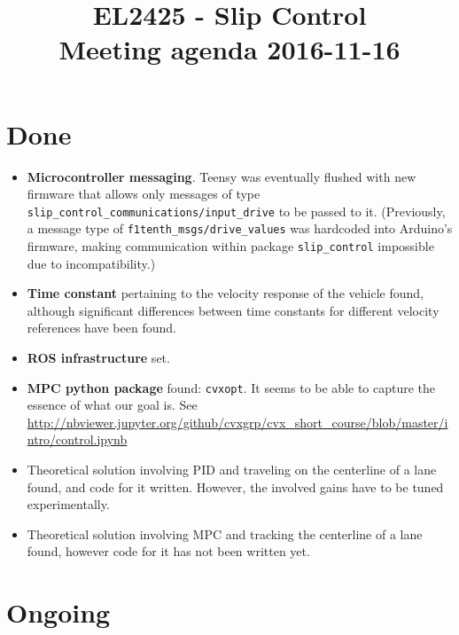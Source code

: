 \documentclass[oneside,12pt]{article}
\title{EL2425 - Slip Control \\ Meeting agenda 2016-11-16}
\begin{document}
\maketitle

\section{Done}

\begin{itemize}

  \item \textbf{Microcontroller messaging}. Teensy was eventually flushed with
    new firmware that allows only messages of type
    \texttt{slip\_control\_communications/input\_drive} to be passed to it.
    (Previously, a message type of \texttt{f1tenth\_msgs/drive\_values}
    was hardcoded into Arduino's firmware, making communication within package
    \texttt{slip\_control} impossible due to incompatibility.)

  \item \textbf{Time constant} pertaining to the velocity response of the vehicle
    found, although significant differences between time constants
    for different velocity references have been found.

  \item \textbf{ROS infrastructure} set.

  \item \textbf{MPC python package} found: \texttt{cvxopt}. It seems to be able to
    capture the essence of what our goal is.
    See \url{http://nbviewer.jupyter.org/github/cvxgrp/cvx_short_course/blob/master/intro/control.ipynb}

  \item Theoretical solution involving PID and traveling on the centerline of a
    lane found, and code for it written. However, the involved gains
    have to be tuned experimentally.

  \item Theoretical solution involving MPC and tracking the centerline of a lane
    found, however code for it has not been written yet.

\end{itemize}



\section{Ongoing}
\end{document}
